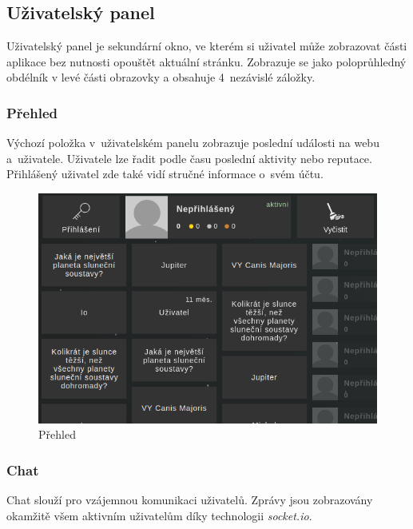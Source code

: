 \documentclass[a4paper,12pt]{article}
\begin{document}
\subsection{Uživatelský panel}

Uživatelský panel je sekundární okno, ve kterém si uživatel může zobrazovat části aplikace bez nutnosti opouštět aktuální stránku. Zobrazuje se jako poloprůhledný obdélník v levé části obrazovky a obsahuje 4~nezávislé záložky.

\subsubsection{Přehled}

Výchozí položka v~uživatelském panelu zobrazuje poslední události na webu a~uživatele. Uživatele lze řadit podle času poslední aktivity nebo reputace. Přihlášený uživatel zde také vidí stručné informace o~svém účtu.

\begin{figure}[H]
\begin{center}
\includegraphics[width=350pt]{Images/Overview.png}
\caption{Přehled}
\label{BodiesList}
\end{center}
\end{figure}

\subsubsection{Chat}

Chat slouží pro vzájemnou komunikaci uživatelů. Zprávy jsou zobrazovány okamžitě všem aktivním uživatelům díky technologii \textit{socket.io}.
\end{document}

